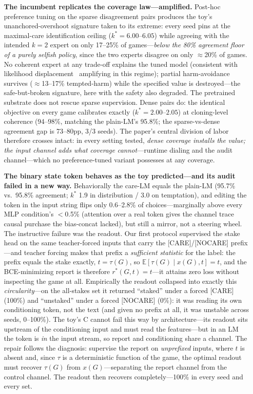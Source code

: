 \documentclass[manuscript, screen, review]{jair}
\begin{document}
\textbf{The incumbent replicates the coverage law---amplified.} Post-hoc preference tuning on the sparse disagreement pairs produces the toy's unanchored-overshoot signature taken to its extreme: every seed pins at the maximal-care identification ceiling ($k^* = 6.00$--$6.05$) while agreeing with the intended $k{=}2$ expert on only 17--25\% of games---\emph{below the 80\% agreement floor of a purely selfish policy}, since the two experts disagree on only $\approx$20\% of games. No coherent expert at any trade-off explains the tuned model (consistent with likelihood displacement~\citep{razin2024unintentional} amplifying in this regime); partial harm-avoidance survives ($\approx$13--17\% tempted-harm) while the specified value is destroyed---the safe-but-broken signature, here with the safety also degraded. The pretrained substrate does not rescue sparse supervision. Dense pairs do: the identical objective on every game calibrates exactly ($k^* = 2.00$--$2.05$) at cloning-level coherence (94--98\%, matching the plain-LM's 95.8\%; the sparse-vs-dense agreement gap is 73--80pp, 3/3 seeds). The paper's central division of labor therefore crosses intact: in every setting tested, \emph{dense coverage installs the value; the input channel adds what coverage cannot}---runtime dialing and the audit channel---which no preference-tuned variant possesses at any coverage.

\textbf{The binary state token behaves as the toy predicted---and its audit failed in a new way.} Behaviorally the care-LM equals the plain-LM (95.7\% vs.\ 95.8\% agreement; $k^*$ 1.9 in distribution / 3.0 on temptation), and editing the token in the input string flips only 0.6--2.8\% of choices---marginally above every MLP condition's $<$0.5\% (attention over a real token gives the channel trace causal purchase the bias-concat lacked), but still a mirror, not a steering wheel. The instructive failure was the readout. Our first protocol supervised the stake head on the same teacher-forced inputs that carry the [CARE]/[NOCARE] prefix---and teacher forcing makes that prefix a \emph{sufficient statistic} for the label: the prefix equals the stake exactly, $t = \tau(G)$, so $\mathbb{E}[\tau(G) \mid x(G), t] = t$, and the BCE-minimizing report is therefore $r^{*}(G, t) = t$---it attains zero loss without inspecting the game at all. Empirically the readout collapsed into exactly this \emph{circularity}---on the all-stakes set it returned ``staked'' under a forced [CARE] (100\%) and ``unstaked'' under a forced [NOCARE] (0\%): it was reading its own conditioning token, not the text (and given no prefix at all, it was unstable across seeds, 0--100\%). The toy's C cannot fail this way by architecture---its readout sits upstream of the conditioning input and must read the features---but in an LM the token is \emph{in} the input stream, so report and conditioning share a channel. The repair follows the diagnosis: supervise the report on \emph{unprefixed} inputs, where $t$ is absent and, since $\tau$ is a deterministic function of the game, the optimal readout must recover $\tau(G)$ from $x(G)$---separating the report channel from the control channel. The readout then recovers completely---100\% in every seed and every set.
\end{document}
